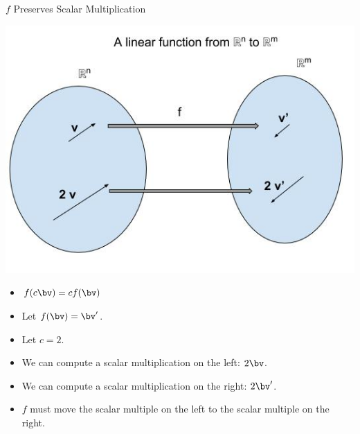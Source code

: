 \documentclass{beamer}
\begin{document}

\begin{frame}{$f$ Preserves Scalar Multiplication}

\begin{center}
\includegraphics[scale=0.25]{preserving-scalar-mult}
\end{center}

\begin{itemize}
\item $f(c \bv) = c f(\bv)$
\item Let $f(\bv) = \bv^{\prime}$.
\item Let $c = 2$.
\item We can compute a scalar multiplication on the left: $2 \bv$.
\item We can compute a scalar multiplication on the right: $2 \bv^{\prime}$.
\item $f$ must move the scalar multiple on the left to the scalar multiple on the right.
\end{itemize}

\end{frame}

\end{document}
